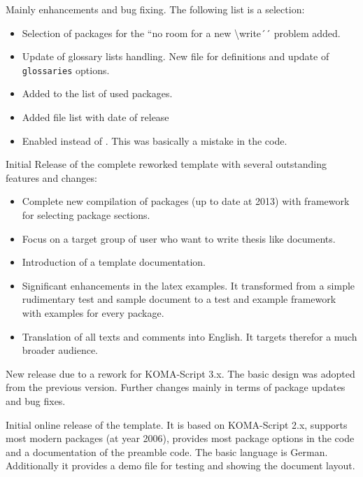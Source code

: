 Mainly enhancements and bug fixing. The following list is a selection:
\begin{itemize}
\item Selection of packages for the ``no room for a new \textbackslash{}write´´ problem added.  
\item Update of glossary lists handling. New file for definitions and update of \texttt{glossaries} options.
\item Added  to the list of used packages.
\item Added file list with date of release
\item Enabled  instead of . This was basically a mistake in the code.
\end{itemize}
%
Initial Release of the complete reworked template with several outstanding features and changes:
\begin{itemize}
\item Complete new compilation of packages (up to date at 2013) with framework for selecting package sections. 
\item Focus on a target group of user who want to write thesis like documents.
\item Introduction of a template documentation.
\item Significant enhancements in the latex examples. 
It transformed from a simple rudimentary test and sample document to a test and example framework
with examples for every package.
\item Translation of all texts and comments into English. It targets therefor a much broader audience.
\end{itemize}
%
New release due to a rework for KOMA-Script 3.x. 
The basic design was adopted from the previous version.
Further changes mainly in terms of package updates and bug fixes.

Initial online release of the template. It is based on KOMA-Script 2.x,
supports most modern packages (at year 2006), provides most package options in the code
and a documentation of the preamble code. The basic language is German.
Additionally it provides a demo file for testing and showing the document layout.
%
